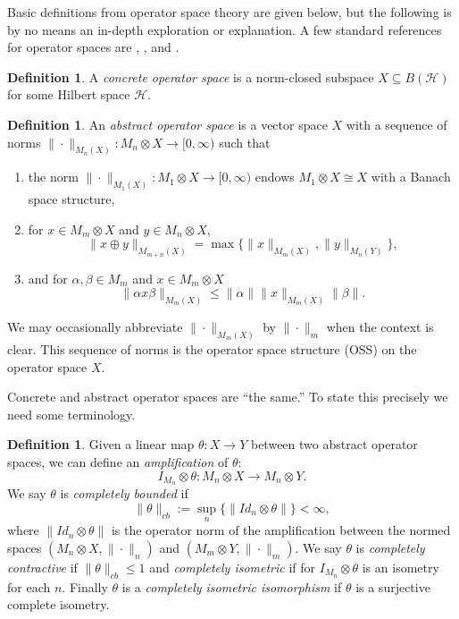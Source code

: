 \documentclass[12pt]{article}
\theoremstyle{definition}
\newtheorem{definition}[theorem]{Definition}
\newcommand{\mc}[1]{\mathcal{#1}}
\newcommand{\<}{\langle}
\renewcommand{\>}{\rangle}
\renewcommand{\subset}{\subseteq}
\begin{document}
Basic definitions from operator space theory are given below, but the following is by no means an in-depth exploration or explanation. A few standard references for operator spaces are \cite{effros-ruan-book}, \cite{intro-op-sp-pisier}, and \cite{paulsen-cb}. 

\begin{definition}
    A \textit{concrete operator space} is a norm-closed subspace $X \subset B(\mc H)$ for some Hilbert space $\mc H$.
\end{definition}

\begin{definition}
    An \textit{abstract operator space} is a vector space $X$ with a sequence of norms $\|\cdot \|_{M_n(X)} : M_n \otimes X \to [0,\infty)$ such that 
    \begin{enumerate}
        \item [(OS1)] the norm $\|\cdot\|_{M_1(X)} : M_1 \otimes X \to [0,\infty)$ endows $M_1 \otimes X \cong X$ with a Banach space structure,
        \item [(OS2)] for $x \in M_m \otimes X$ and $y \in M_n \otimes X$,
        \[
        \|x \oplus y\|_{M_{m+n}(X)} = \max\{\|x\|_{M_m(X)},\|y\|_{M_n(Y)}\},
        \]
        \item [(OS3)] and for $\alpha, \beta \in M_m$ and $x \in M_m \otimes X$
        \[
        \|\alpha x \beta\|_{M_m(X)} \leq \|\alpha\| \|x\|_{M_m(X)} \|\beta\|.
        \]
    \end{enumerate}
    We may occasionally abbreviate $\|\cdot \|_{M_m(X)}$ by $\|\cdot \|_m$ when the context is clear. This sequence of norms is the operator space structure (OSS) on the operator space $X$.
\end{definition}

Concrete and abstract operator spaces are ``the same.'' To state this precisely we need some terminology.

\begin{definition}
    Given a linear map $\theta: X \to Y$ between two abstract operator spaces, we can define an \textit{amplification} of $\theta$:
    \[
    I_{M_n} \otimes \theta : M_n \otimes X \to M_n \otimes Y.
    \]
    We say $\theta$ is \textit{completely bounded} if
    \[
    \|\theta\|_{cb} := \sup_n \{\|Id_n \otimes \theta\|\} < \infty,
    \]
    where $\|Id_n \otimes \theta\|$ is the operator norm of the amplification between the normed spaces $(M_n \otimes X, \|\cdot\|_n)$ and $(M_m \otimes Y, \|\cdot\|_m)$. We say $\theta$ is \textit{completely contractive} if $\|\theta\|_{cb} \leq 1$ and \textit{completely isometric} if for $I_{M_n} \otimes \theta$ is an isometry for each $n$.
    Finally $\theta$ is a \textit{completely isometric isomorphism} if $\theta$ is a surjective complete isometry.
\end{definition}
\end{document}
